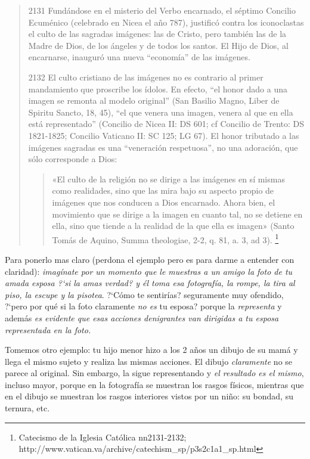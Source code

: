 \documentclass{article}
\begin{document}
\begin{quote}
2131 Fundándose en el misterio del Verbo encarnado, el séptimo Concilio Ecuménico (celebrado en Nicea el año 787), justificó contra los iconoclastas el culto de las sagradas imágenes: las de Cristo, pero también las de la Madre de Dios, de los ángeles y de todos los santos. El Hijo de Dios, al encarnarse, inauguró una nueva “economía” de las imágenes.

2132 El culto cristiano de las imágenes no es contrario al primer mandamiento que proscribe los ídolos. En efecto, “el honor dado a una imagen se remonta al modelo original” (San Basilio Magno, Liber de Spiritu Sancto, 18, 45), “el que venera una imagen, venera al que en ella está representado” (Concilio de Nicea II: DS 601; cf Concilio de Trento: DS 1821-1825; Concilio Vaticano II: SC 125; LG 67). El honor tributado a las imágenes sagradas es una “veneración respetuosa”, no una adoración, que sólo corresponde a Dios:

    \begin{quote}
    \small{«El culto de la religión no se dirige a las imágenes en sí mismas como realidades, sino que las mira bajo su aspecto propio de imágenes que nos conducen a Dios encarnado. Ahora bien, el movimiento que se dirige a la imagen en cuanto tal, no se detiene en ella, sino que tiende a la realidad de la que ella es imagen» (Santo Tomás de Aquino, Summa theologiae, 2-2, q. 81, a. 3, ad 3).}%
    \footnote{Catecismo de la Iglesia Católica nn2131-2132; http://www.vatican.va/archive/catechism\_sp/p3s2c1a1\_sp.html}
    \end{quote}
\end{quote}

\noindent
Para ponerlo mas claro (perdona el ejemplo pero es para darme a entender con claridad): \emph{imag\'{i}nate por un momento que le muestras a un amigo la foto de tu amada esposa ?`si la amas verdad? y \'el toma esa fotograf\'{i}a, la rompe, la tira al piso, la escupe y la pisotea}. ?`C\'omo te sentir\'{i}as? seguramente muy ofendido, ?`pero por qu\'e si la foto claramente \emph{no es} tu esposa? porque la \emph{representa} y adem\'as \emph{es evidente que esas acciones denigrantes van dirigidas a tu esposa representada en la foto.}

Tomemos otro ejemplo: tu hijo menor hizo a los 2 a\~nos un dibujo de su mam\'a y llega el mismo sujeto y realiza las mismas acciones. El dibujo \emph{claramente} no se parece al original. Sin embargo, la sigue representando y \emph{el resultado es el mismo}, incluso mayor, porque en la fotograf\'{i}a se muestran los rasgos f\'{i}sicos, mientras que en el dibujo se muestran los rasgos interiores vistos por un ni\~no: su bondad, su ternura, etc.
\end{document}
